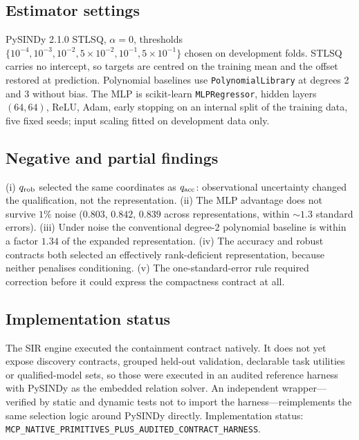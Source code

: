 \subsection{Estimator settings}
PySINDy 2.1.0 STLSQ, $\alpha=0$, thresholds
$\{10^{-4},10^{-3},10^{-2},5\times10^{-2},10^{-1},5\times10^{-1}\}$ chosen on
development folds. STLSQ carries no intercept, so targets are centred on the
training mean and the offset restored at prediction. Polynomial baselines use
\texttt{PolynomialLibrary} at degrees 2 and 3 without bias. The MLP is
scikit-learn \texttt{MLPRegressor}, hidden layers $(64,64)$, ReLU, Adam,
early stopping on an internal split of the training data, five fixed seeds;
input scaling fitted on development data only.

\subsection{Negative and partial findings}
(i) $q_{\rm rob}$ selected the same coordinates as $q_{\rm acc}$: observational
uncertainty changed the qualification, not the representation.
(ii) The MLP advantage does not survive $1\%$ noise ($0.803$, $0.842$, $0.839$
across representations, within ${\sim}1.3$ standard errors).
(iii) Under noise the conventional degree-2 polynomial baseline is within a
factor $1.34$ of the expanded representation.
(iv) The accuracy and robust contracts both selected an effectively
rank-deficient representation, because neither penalises conditioning.
(v) The one-standard-error rule required correction before it could express the
compactness contract at all.

\subsection{Implementation status}
The SIR engine executed the containment contract natively. It does not yet expose
discovery contracts, grouped held-out validation, declarable task utilities or
qualified-model sets, so those were executed in an audited reference harness with
PySINDy as the embedded relation solver. An independent wrapper---verified by
static and dynamic tests not to import the harness---reimplements the same
selection logic around PySINDy directly. Implementation status:
\texttt{MCP\_NATIVE\_PRIMITIVES\_PLUS\_AUDITED\_CONTRACT\_HARNESS}.

